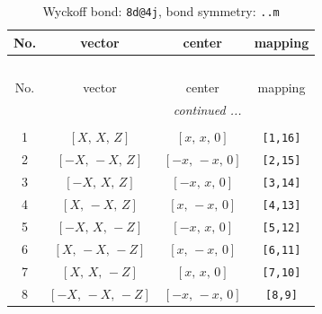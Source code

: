 \documentclass[fleqn,8pt]{jsarticle}
\begin{document}
\begin{longtable}{cccc}
\caption{Wyckoff bond: {\tt 8d@4j}, bond symmetry: {\tt ..m}}
 \\
 \hline \hline
No. & vector & center & mapping \\ \hline \endfirsthead

\multicolumn{3}{l}{\tablename\ \thetable{}} \\
 \hline \hline
No. & vector & center & mapping \\ \hline \endhead

 \hline \hline
\multicolumn{3}{r}{\footnotesize\it continued ...} \\ \endfoot

 \hline \hline
\multicolumn{3}{r}{} \\ \endlastfoot

1 & $\left[ X,\, X,\, Z \right]$ & $\left[ x,\, x,\, 0 \right]$ & {\tt [1,16]} \\ \hline
2 & $\left[ - X,\, - X,\, Z \right]$ & $\left[ - x,\, - x,\, 0 \right]$ & {\tt [2,15]} \\ \hline
3 & $\left[ - X,\, X,\, Z \right]$ & $\left[ - x,\, x,\, 0 \right]$ & {\tt [3,14]} \\ \hline
4 & $\left[ X,\, - X,\, Z \right]$ & $\left[ x,\, - x,\, 0 \right]$ & {\tt [4,13]} \\ \hline
5 & $\left[ - X,\, X,\, - Z \right]$ & $\left[ - x,\, x,\, 0 \right]$ & {\tt [5,12]} \\ \hline
6 & $\left[ X,\, - X,\, - Z \right]$ & $\left[ x,\, - x,\, 0 \right]$ & {\tt [6,11]} \\ \hline
7 & $\left[ X,\, X,\, - Z \right]$ & $\left[ x,\, x,\, 0 \right]$ & {\tt [7,10]} \\ \hline
8 & $\left[ - X,\, - X,\, - Z \right]$ & $\left[ - x,\, - x,\, 0 \right]$ & {\tt [8,9]} \\
\end{longtable}
\renewcommand{\arraystretch}{1.2}
\end{document}

